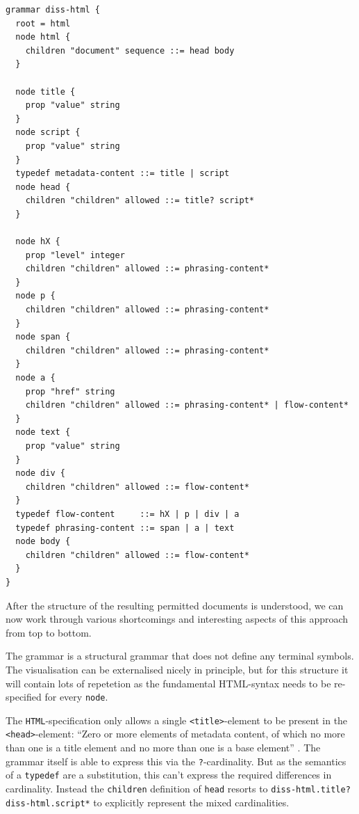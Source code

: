 \documentclass[]{report}
\begin{document}
\begin{listing}[p]
\begin{verbatim}
grammar diss-html {
  root = html
  node html {
    children "document" sequence ::= head body
  }

  node title {
    prop "value" string
  }
  node script {
    prop "value" string
  }
  typedef metadata-content ::= title | script
  node head {
    children "children" allowed ::= title? script*
  }

  node hX {
    prop "level" integer
    children "children" allowed ::= phrasing-content*
  }
  node p {
    children "children" allowed ::= phrasing-content*
  }
  node span {
    children "children" allowed ::= phrasing-content*
  }
  node a {
    prop "href" string
    children "children" allowed ::= phrasing-content* | flow-content*
  }
  node text {
    prop "value" string
  }
  node div {
    children "children" allowed ::= flow-content*
  }
  typedef flow-content     ::= hX | p | div | a
  typedef phrasing-content ::= span | a | text
  node body {
    children "children" allowed ::= flow-content*
  }
}
\end{verbatim}
\caption{Minimal example for an HTML grammar using \texttt{typedef} for different content models}
\label{lst:example-grammar-html-typedef-content-model}
\end{listing}


After the structure of the resulting permitted documents is understood, we can now work through various shortcomings and interesting aspects of this approach from top to bottom.

The grammar is a structural grammar that does not define any terminal symbols. The visualisation can be externalised nicely in principle, but for this structure it will contain lots of repetetion as the fundamental HTML-syntax needs to be re-specified for every \texttt{node}.

The \texttt{HTML}-specification only allows a single \texttt{<title>}-element to be present in the \texttt{<head>}-element: \enquote{Zero or more elements of metadata content, of which no more than one is a title element and no more than one is a base element} \cite[§4.2.1 The head element]{whatwgHTMLLivingStandard}. The grammar itself is able to express this via the \texttt{?}-cardinality. But as the semantics of a \texttt{typedef} are a substitution, this can't express the required differences in cardinality. Instead the \texttt{children} definition of \texttt{head} resorts to \texttt{diss-html.title? diss-html.script*} to explicitly represent the mixed cardinalities.
\end{document}
